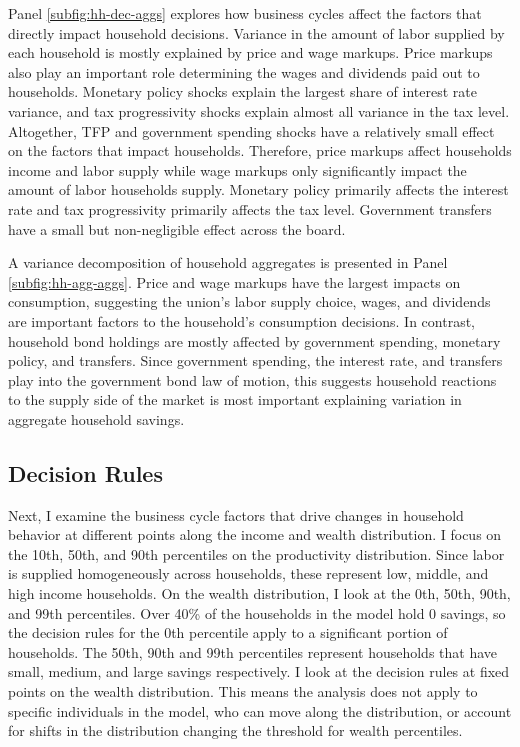 Panel \ref{subfig:hh-dec-aggs} explores how business cycles affect the factors that directly impact household decisions. Variance in the amount of labor supplied by each household is mostly explained by price and wage markups. Price markups also play an important role determining the wages and dividends paid out to households. Monetary policy shocks explain the largest share of interest rate variance, and tax progressivity shocks explain almost all variance in the tax level. Altogether, TFP and government spending shocks have a relatively small effect on the factors that impact households. Therefore, price markups affect households income and labor supply while wage markups only significantly impact the amount of labor households supply. Monetary policy primarily affects the interest rate and tax progressivity primarily affects the tax level. Government transfers have a small but non-negligible effect across the board.

A variance decomposition of household aggregates is presented in Panel \ref{subfig:hh-agg-aggs}. Price and wage markups have the largest impacts on consumption, suggesting the union's labor supply choice, wages, and dividends are important factors to the household's consumption decisions. In contrast, household bond holdings are mostly affected by government spending, monetary policy, and transfers. Since government spending, the interest rate, and transfers play into the government bond law of motion, this suggests household reactions to the supply side of the market is most important explaining variation in aggregate household savings.


\subsection{Decision Rules} \label{subsec:buis-dec-rules}

Next, I examine the business cycle factors that drive changes in household behavior at different points along the income and wealth distribution. I focus on the 10th, 50th, and 90th percentiles on the productivity distribution. Since labor is supplied homogeneously across households, these represent low, middle, and high income households. On the wealth distribution, I look at the 0th, 50th, 90th, and 99th percentiles. Over 40\% of the households in the model hold 0 savings, so the decision rules for the 0th percentile apply to a significant portion of households. The 50th, 90th and 99th percentiles represent households that have small, medium, and large savings respectively. I look at the decision rules at fixed points on the wealth distribution. This means the analysis does not apply to specific individuals in the model, who can move along the distribution, or account for shifts in the distribution changing the threshold for wealth percentiles.

